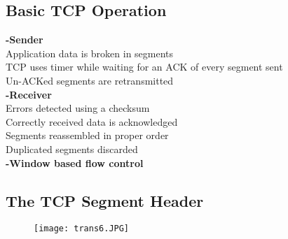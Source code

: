 \documentclass[../resumosRCOM.tex]{subfiles}
\begin{document}
\subsection{Basic TCP Operation}
\textbf{-Sender}\\
Application data is broken in segments\\
TCP uses timer while waiting for an ACK of every segment sent\\
Un-ACKed segments are retransmitted\\
\textbf{-Receiver}\\
Errors detected using a checksum\\
Correctly received data is acknowledged\\
Segments reassembled in proper order\\
Duplicated segments discarded\\
\textbf{-Window based flow control}

\subsection{The TCP Segment Header}
\begin{figure}[h]
    \centering
    \texttt{[image: trans6.JPG]}
\end{figure}
\end{document}

